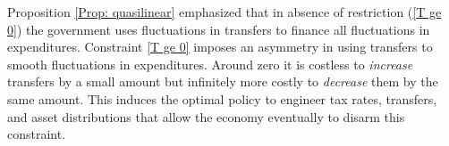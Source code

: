 \documentclass[thmsb,11pt]{article}
\begin{document}
Proposition \ref{Prop: quasilinear} emphasized that in absence of restriction (\ref{T ge 0}) the government uses fluctuations in transfers to finance all fluctuations in expenditures.  Constraint \ref{T ge 0} imposes an asymmetry in using transfers to smooth fluctuations in expenditures. Around zero it is costless to {\em increase} transfers by a small amount but infinitely more costly to {\em decrease} them by the same amount. This induces the optimal policy to engineer tax rates, transfers,  and asset distributions that allow the economy eventually to  disarm this constraint.
%
%
%
%
\end{document}
